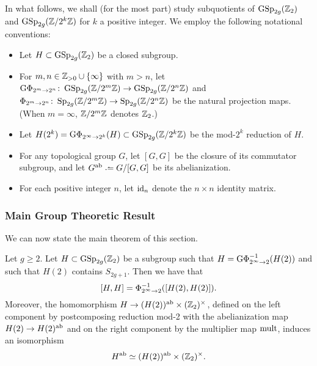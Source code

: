 In what follows, we shall (for the most part) study subquotients of $\operatorname{GSp}_{2g}(\mathbb Z_2)$ and $\operatorname{GSp}_{2g}(\mathbb Z/ 2^k \mathbb Z)$ for $k$ a positive integer. We employ the following notational conventions:
\begin{itemize}
\item Let $H\subset \operatorname{GSp}_{2g}(\mathbb Z_2)$ be a closed subgroup.
\item For $m, n \in \mathbb Z_{> 0} \cup \{\infty\}$ 
		with $m > n$, let $\mathrm{G}\Phi_{2^m \to 2^n} \colon \operatorname{GSp}_{2g}(\mathbb Z/2^m \mathbb Z) \to \operatorname{GSp}_{2g}(\mathbb Z/2^n \mathbb Z)$ and $\Phi_{2^m \to 2^n} \colon \operatorname{Sp}_{2g}(\mathbb Z/2^m \mathbb Z) \to \operatorname{Sp}_{2g}(\mathbb Z/2^n \mathbb Z)$ be the natural projection maps. (When $m = \infty$, $\mathbb Z/2^m\mathbb Z$ denotes $\mathbb Z_2$.) 
\item Let $H(2^k) = \mathrm{G}\Phi_{2^\infty \to 2^k}(H) \subset \operatorname{GSp}_{2g}(\mathbb Z/2^k \mathbb Z)$ be the mod-$2^k$ reduction of $H$.
\item For any topological group $G$, let $[G,G]$ be the closure of its commutator subgroup, and let $G^{\ab} \defeq G/{ {[G,G]}}$ be its abelianization.
\item For each positive integer $n$, let $\operatorname{id}_n$ denote the $n \times n$ identity matrix.
\end{itemize}

\subsubsection{Main Group Theoretic Result}

We can now state the main theorem of this section.

\begin{theorem} \label{theorem:small-ab}
	Let $g \geq 2$. Let $H \subset \operatorname{GSp}_{2g}({\mathbb Z}_2)$ be a subgroup such that $H = \mathrm{G}\Phi_{2^\infty \to 2}^{-1}(H(2))$    and such that $H(2)$ contains $S_{2g+1}$. 
    Then we have that
	\begin{equation}\label{thefirstclaim}
    [H, H] = \Phi_{2^\infty \to 2}^{-1}([H(2), H(2)]).
    \end{equation}
	Moreover, the homomorphism \(H \to (H(2))^{\operatorname{ab}} \times ({\mathbb Z}_2)^\times\), defined on the left component by postcomposing reduction mod-2 with the abelianization map $H(2) \to H(2)^{\operatorname{ab}}$ and on the right component by the multiplier map $\operatorname{mult}$, induces an isomorphism
    \begin{equation}\label{thesecondclaim}
    H^{\operatorname{ab}} \simeq (H(2))^{\operatorname{ab}} \times ({\mathbb Z}_2)^\times.
    \end{equation}
\end{theorem}

